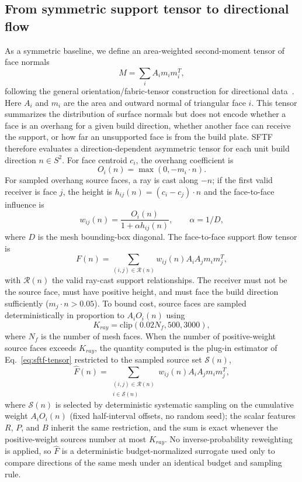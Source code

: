 \documentclass[12pt]{article}
\begin{document}
\subsection{From symmetric support tensor to directional flow}
\label{sec:sftf}
As a symmetric baseline, we define an area-weighted second-moment tensor of face
normals
\begin{equation}
M=\sum_i A_i m_i m_i^T,
\end{equation}
following the general orientation/fabric-tensor construction for directional
data~\cite{kanatani1984}. Here $A_i$ and $m_i$ are the area and outward normal of
triangular face $i$. This tensor summarizes the distribution of surface normals but
does not encode whether a face is an overhang for a given build direction, whether
another face can receive the support, or how far an unsupported face is from the
build plate. SFTF therefore evaluates a direction-dependent asymmetric tensor for
each unit build direction $n\in S^2$. For face centroid $c_i$, the overhang
coefficient is
\begin{equation}
O_i(n)=\max(0,-m_i\cdot n).
\end{equation}
For sampled overhang source faces, a ray is cast along $-n$; if the first valid
receiver is face $j$, the height is $h_{ij}(n)=(c_i-c_j)\cdot n$ and the face-to-face
influence is
\begin{equation}
w_{ij}(n)=\frac{O_i(n)}{1+\alpha h_{ij}(n)}, \qquad \alpha=1/D,
\end{equation}
where $D$ is the mesh bounding-box diagonal. The face-to-face support flow tensor is
\begin{equation}
F(n)=\sum_{(i,j)\in\mathcal{R}(n)} w_{ij}(n)A_iA_jm_im_j^T,
\label{eq:sftf-tensor}
\end{equation}
with $\mathcal{R}(n)$ the valid ray-cast support relationships. The receiver must not
be the source face, must have positive height, and must face the build direction
sufficiently ($m_j\cdot n>0.05$). To bound cost, source faces are sampled
deterministically in proportion to $A_iO_i(n)$ using
\begin{equation}
K_{ray}=\mathrm{clip}(0.02N_f,500,3000),
\label{eq:kray-budget}
\end{equation}
where $N_f$ is the number of mesh faces. When the number of positive-weight source
faces exceeds $K_{ray}$, the quantity computed is the plug-in estimator of
Eq.~\eqref{eq:sftf-tensor} restricted to the sampled source set $\mathcal{S}(n)$,
\begin{equation}
\hat F(n)=\sum_{\substack{(i,j)\in\mathcal{R}(n)\\ i\in\mathcal{S}(n)}} w_{ij}(n)A_iA_jm_im_j^T,
\label{eq:sftf-tensor-estimator}
\end{equation}
where $\mathcal{S}(n)$ is selected by deterministic systematic sampling on the
cumulative weight $A_iO_i(n)$ (fixed half-interval offsets, no random seed); the
scalar features $R$, $P$, and $B$ inherit the same restriction, and the sum is exact
whenever the positive-weight sources number at most $K_{ray}$. No inverse-probability
reweighting is applied, so $\hat F$ is a deterministic budget-normalized surrogate
used only to compare directions of the same mesh under an identical budget and
sampling rule.
\end{document}
